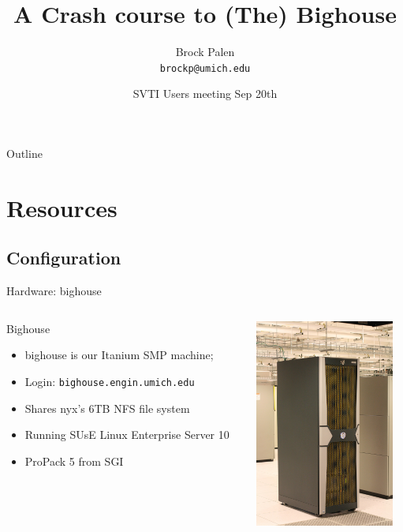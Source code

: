 \documentclass[handout]{beamer}
\title[Bighouse Crash] {A Crash course to (The) Bighouse}
\author{Brock Palen\\ \texttt{brockp@umich.edu}}
\date{SVTI Users meeting Sep 20th}
\begin{document}
  \begin{frame}
    \titlepage
  \end{frame}

  \begin{frame}{Outline}
    \tableofcontents
  \end{frame}
  
  \section{Resources}
  \subsection {Configuration}
  \begin{frame}{Hardware: bighouse}
   \begin{columns}[c]
    \begin{column}{7cm}
    \begin{block}{Bighouse}
    \begin{itemize}
      \item bighouse is our Itanium SMP machine;
      \item Login: \texttt{bighouse.engin.umich.edu}
      \item Shares nyx's 6TB NFS file system
      \item Running SUsE Linux Enterprise Server 10
      \item ProPack 5 from SGI
    \end{itemize}
   \end{block}
   \end{column}
   \begin{column}{5cm}
    \begin{center}\includegraphics[height=2.7in]{tallbighouse}\end{center}
   \end{column}
   \end{columns}
  \end{frame}
\end{document}
